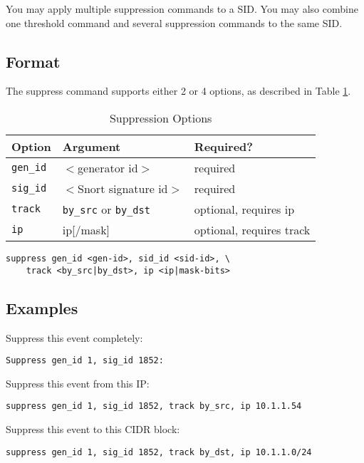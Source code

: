 \documentclass[english]{report}
\begin{document}
You may apply multiple suppression commands to a SID.  You may also combine one
threshold command and several suppression commands to the same SID.  

\subsection{Format}

The suppress command supports either 2 or 4 options, as described in Table \ref{suppression_options}. 

\begin{table}[!hbpt]
\caption{Suppression Options\label{suppression_options}}
\begin{center}\begin{tabular}{| l | p{3.5in} | l |}
\hline
\textbf{Option} & \textbf{Argument} & \textbf{Required?}\\
\hline
\hline
\texttt{gen\_id} & $<$generator id$>$ & required\\
\hline
\texttt{sig\_id} & $<$Snort signature id$>$  & required\\
\hline
\texttt{track} & \texttt{by\_src} or \texttt{by\_dst}  & optional, requires ip\\
\hline
\texttt{ip} & ip[/mask] & optional, requires track \\
\hline
\end{tabular}\end{center}
\end{table}

\begin{verbatim}
suppress gen_id <gen-id>, sid_id <sid-id>, \
    track <by_src|by_dst>, ip <ip|mask-bits>
\end{verbatim}

\subsection{Examples}
Suppress this event completely:
\begin{verbatim}
Suppress gen_id 1, sig_id 1852:
\end{verbatim}

Suppress this event from this IP:
\begin{verbatim}
suppress gen_id 1, sig_id 1852, track by_src, ip 10.1.1.54
\end{verbatim}

Suppress this event to this CIDR block:
\begin{verbatim}
suppress gen_id 1, sig_id 1852, track by_dst, ip 10.1.1.0/24
\end{verbatim}
\end{document}
